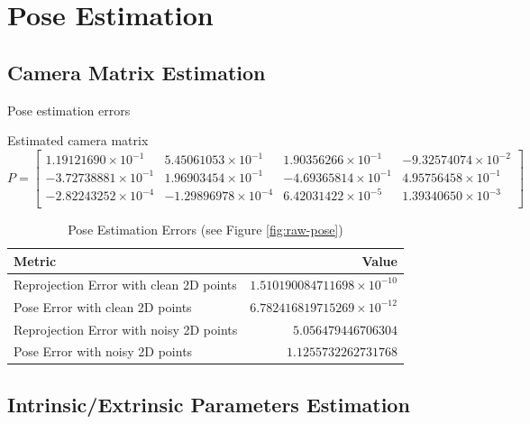 \section{Pose Estimation}


\subsection{Camera Matrix Estimation}

Pose estimation errors

Estimated camera matrix
\[ 
  P = \begin{bmatrix}
    1.19121690 \times 10^{-1} & 5.45061053 \times 10^{-1} & 1.90356266 \times 10^{-1} & -9.32574074 \times 10^{-2} \\
    -3.72738881 \times 10^{-1} & 1.96903454 \times 10^{-1} & -4.69365814 \times 10^{-1} & 4.95756458 \times 10^{-1} \\
    -2.82243252 \times 10^{-4} & -1.29896978 \times 10^{-4} & 6.42031422 \times 10^{-5} & 1.39340650 \times 10^{-3} \\
  \end{bmatrix}
\]


\begin{table}[H]
  \centering
  \begin{tabular}[2]{l | r |}
    \toprule
    \textbf{Metric} & \textbf{Value} \\
    \midrule
    Reprojection Error with clean 2D points & $1.510190084711698 \times 10^{-10}$ \\
    Pose Error with clean 2D points & $6.782416819715269 \times 10^{-12}$ \\
    Reprojection Error with noisy 2D points & $5.056479446706304$ \\
    Pose Error with noisy 2D points & $1.1255732262731768$ \\
    \bottomrule
  \end{tabular}
  \caption{Pose Estimation Errors (see Figure \ref{fig:raw-pose})}
\end{table}

\subsection{Intrinsic/Extrinsic Parameters Estimation}

